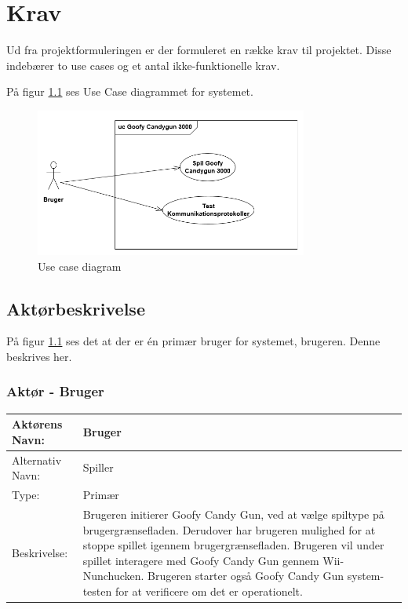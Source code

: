 \chapter{Krav}
Ud fra projektformuleringen er der formuleret en række krav til projektet. Disse indebærer to use cases og et antal ikke-funktionelle krav. 

På figur \ref{fig:useCaseDiagram} ses Use Case diagrammet for systemet.

\begin{figure}[H]
	\centering
	\includegraphics[width=0.80\textwidth]{Kravsspecifikation/images/usecaseDiagram.png}
	\caption{Use case diagram}
	\label{fig:useCaseDiagram}
\end{figure}

\section{Aktørbeskrivelse}
På figur \ref{fig:useCaseDiagram} ses det at der er én primær bruger for systemet, brugeren. Denne beskrives her.

\subsection{Aktør - Bruger}

\begin{tabularx}{\textwidth}{| p{2cm} | p{9.1cm} |}
	\hline
	Aktørens Navn: & Bruger \\ 
	\hline
	Alternativ Navn: & Spiller \\
	\hline
	Type: & Primær \\
	\hline
	Beskrivelse: & Brugeren initierer Goofy Candy Gun, ved at vælge spiltype på brugergrænsefladen. Derudover har brugeren mulighed for at stoppe spillet igennem brugergrænsefladen. Brugeren vil under spillet interagere med Goofy Candy Gun gennem Wii-Nunchucken. \newline
	Brugeren starter også Goofy Candy Gun system-testen for at verificere om det er operationelt. \\
	\hline
\end{tabularx}

